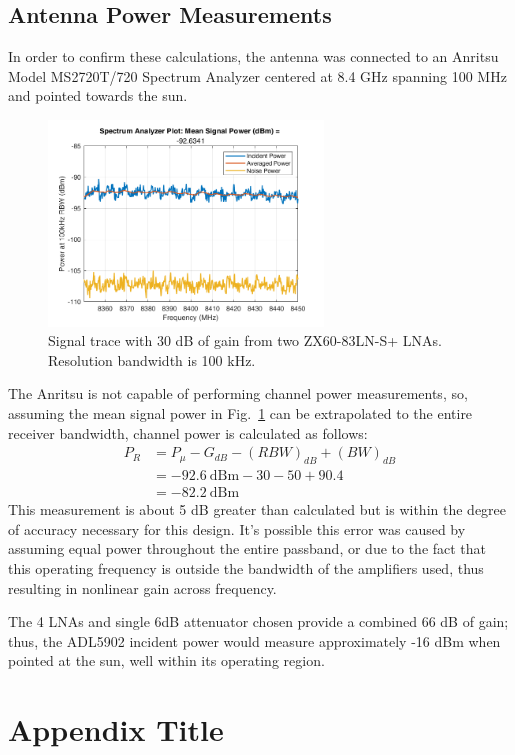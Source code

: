 \documentclass[titlepage]{article}
\begin{document}
\subsection{Antenna Power Measurements}
In order to confirm these calculations, the antenna was connected to an Anritsu Model MS2720T/720 Spectrum Analyzer centered at 8.4 GHz spanning 100 MHz and pointed towards the sun.
\begin{figure}[H]%
\begin {center}
\includegraphics[width=0.65\textwidth]{images/specan1.png}
\caption{Signal trace with 30 dB of gain from two ZX60-83LN-S+ LNAs. Resolution bandwidth is 100 kHz.}
\label{fig:specan1}
\end {center}
\end{figure}
The Anritsu is not capable of performing channel power measurements, so, assuming the mean signal power in Fig.~\ref{fig:specan1} can be extrapolated to the entire receiver bandwidth, channel power is calculated as follows:
\begin{align*}
    P_R &= P_{\mu} - G_{dB} - \left(RBW\right)_{dB} + \left(BW\right)_{dB}\\
        &= -92.6\ \text{dBm} - 30 - 50 + 90.4\\
        &= -82.2\ \text{dBm}
\end{align*}
This measurement is about 5 dB greater than calculated but is within the degree of accuracy necessary for this design. It's possible this error was caused by assuming equal power throughout the entire passband, or due to the fact that this operating frequency is outside the bandwidth of the amplifiers used, thus resulting in nonlinear gain across frequency.

The 4 LNAs and single 6dB attenuator chosen provide a combined 66 dB of gain; thus, the ADL5902 incident power would measure approximately -16 dBm when pointed at the sun, well within its operating region.


\appendix
\section{Appendix Title}
\end{document}

